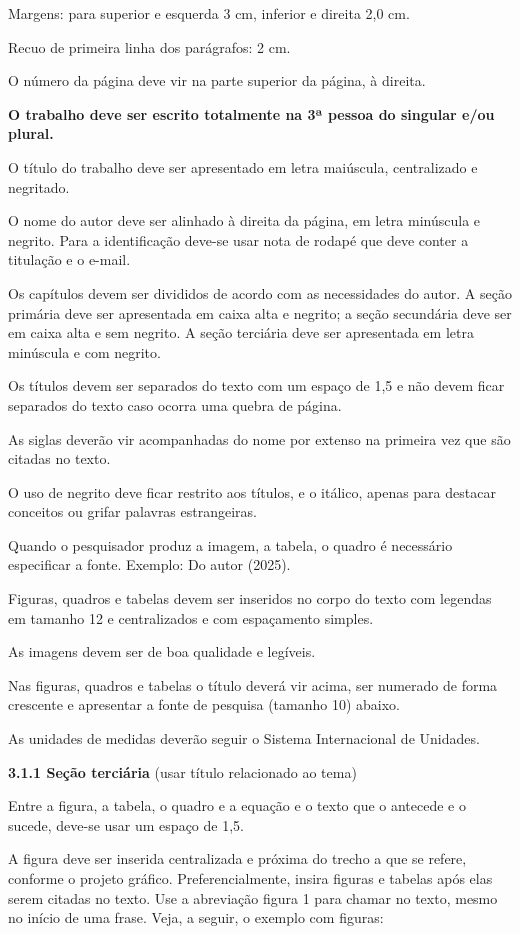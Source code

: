 \documentclass[
]{article}
\begin{document}
Margens: para superior e esquerda 3 cm, inferior e direita 2,0 cm.

Recuo de primeira linha dos parágrafos: 2 cm.

O número da página deve vir na parte superior da página, à direita.

\textbf{O trabalho deve ser escrito totalmente na 3ª pessoa do singular
e/ou plural.}

O título do trabalho deve ser apresentado em letra maiúscula,
centralizado e negritado.

O nome do autor deve ser alinhado à direita da página, em letra
minúscula e negrito. Para a identificação deve-se usar nota de rodapé
que deve conter a titulação e o e-mail.

Os capítulos devem ser divididos de acordo com as necessidades do autor.
A seção primária deve ser apresentada em caixa alta e negrito; a seção
secundária deve ser em caixa alta e sem negrito. A seção terciária deve
ser apresentada em letra minúscula e com negrito.

Os títulos devem ser separados do texto com um espaço de 1,5 e não devem
ficar separados do texto caso ocorra uma quebra de página.

As siglas deverão vir acompanhadas do nome por extenso na primeira vez
que são citadas no texto.

O uso de negrito deve ficar restrito aos títulos, e o itálico, apenas
para destacar conceitos ou grifar palavras estrangeiras.

Quando o pesquisador produz a imagem, a tabela, o quadro é necessário
especificar a fonte. Exemplo: Do autor (2025).

Figuras, quadros e tabelas devem ser inseridos no corpo do texto com
legendas em tamanho 12 e centralizados e com espaçamento simples.

As imagens devem ser de boa qualidade e legíveis.

Nas figuras, quadros e tabelas o título deverá vir acima, ser numerado
de forma crescente e apresentar a fonte de pesquisa (tamanho 10) abaixo.

As unidades de medidas deverão seguir o Sistema Internacional de
Unidades.

\textbf{3.1.1 Seção terciária} (usar título relacionado ao tema)

Entre a figura, a tabela, o quadro e a equação e o texto que o antecede
e o sucede, deve-se usar um espaço de 1,5.

A figura deve ser inserida centralizada e próxima do trecho a que se
refere, conforme o projeto gráfico. Preferencialmente, insira figuras e
tabelas após elas serem citadas no texto. Use a abreviação figura 1 para
chamar no texto, mesmo no início de uma frase. Veja, a seguir, o exemplo
com figuras:
\end{document}
